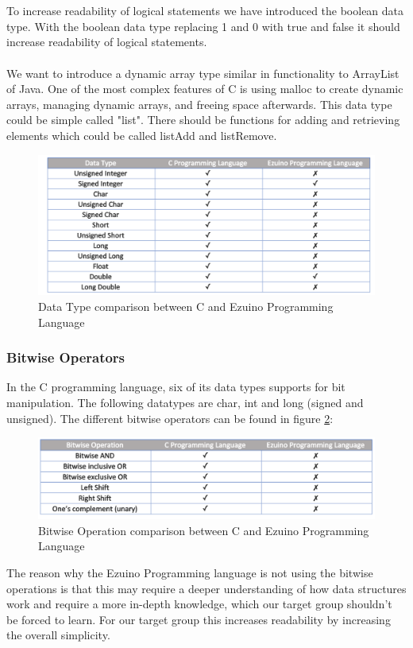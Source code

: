 \\\\
To increase readability of logical statements we have introduced the boolean data type. With the boolean data type replacing 1 and 0 with true and false it should increase readability of logical statements. 
\\ \\
We want to introduce a dynamic array type similar in functionality to ArrayList of Java. One of the most complex features of C is using malloc to create dynamic arrays, managing dynamic arrays, and freeing space afterwards. This data type could be simple called "list". There should be functions for adding and retrieving elements which could be called listAdd and listRemove. 
\begin{figure}[H]
\centering
\includegraphics[scale=0.60]{figures/language_features/langf01.png}
\caption{Data Type comparison between C and Ezuino Programming Language}
\label{lf01}
\end{figure}
\subsubsection*{Bitwise Operators}
In the C programming language, six of its data types supports for bit manipulation. The following datatypes are char, int and long (signed and unsigned).  The different bitwise operators can be found in figure \ref{lf02}: 
\begin{figure}[H]
\centering
\includegraphics[scale=0.60]{figures/language_features/langf02.png}
\caption{Bitwise Operation comparison between C and Ezuino Programming Language}
\label{lf02}
\end{figure}
The reason why the Ezuino Programming language is not using the bitwise operations is that this may require a deeper understanding of how data structures work and require a more in-depth knowledge, which our target group shouldn't be forced to learn. For our target group this increases readability by increasing the overall simplicity.

